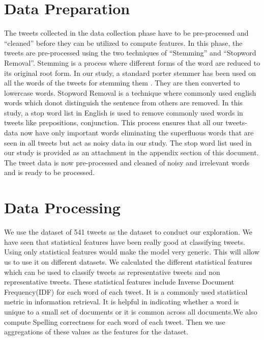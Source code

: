 \section{Data Preparation}
The tweets collected in the data collection phase have to be pre-processed and “cleaned” before they can be utilized to compute features.  In this phase, the tweets are pre-processed using the two techniques of “Stemming” and “Stopword Removal”. Stemming is a process where different forms of the word are reduced to its original root form. In our study, a standard porter stemmer has been used on all the words of the tweets for stemming them . They are then converted to lowercase words. Stopword Removal is a technique where commonly used english words which donot distinguish the sentence from others are removed. In this study, a stop word list in English is used to remove commonly used words in tweets like prepositions, conjunction. This process ensures that all our tweets-data now have only important words eliminating  the superfluous  words that are seen in all tweets but act as noisy data in our study. The stop word list used in our study is provided as an attachment in the appendix section of this document. The tweet data is now pre-processed and cleaned of noisy and irrelevant words and is ready to be processed. 

\section{Data Processing}
We use the dataset of 541 tweets as the dataset to conduct our exploration. We have seen that statistical features have been really good at classifying tweets. Using only statistical features would make the model very generic. This will allow us to use it on different datasets. We calculated the different statistical features which can be used to classify tweets as representative tweets and non representative tweets. These statistical features include Inverse Document Frequency(IDF) for each word of each tweet. It is a commonly used statistical metric in information retrieval. It is helpful in indicating whether a word is unique to a small set of documents or it is common across all documents.We also compute Spelling correctness for each word of each tweet. Then we use aggregations of these values as the features for the dataset. 

